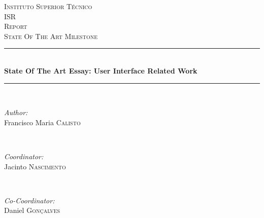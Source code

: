 \begin{titlepage}

\newcommand{\HRule}{\rule{\linewidth}{0.5mm}} %

\center %
 

\textsc{\LARGE Instituto Superior T\'{e}cnico}\\[1.5cm]
\textsc{\Large ISR}\\[0.5cm]
\textsc{\large Report}\\[0.25cm]
\textsc{\small State Of The Art Milestone}\\[0.25cm]


\HRule \\[0.5cm]
{ \large \bfseries State Of The Art Essay: User Interface Related Work}\\[0.25cm] %
\HRule \\[0.5cm]
 

\begin{minipage}{0.4\textwidth}
\begin{flushleft} \large
\emph{Author:}\\
Francisco Maria \textsc{Calisto} %
\end{flushleft}
\end{minipage}
~
\begin{minipage}{0.4\textwidth}
\begin{flushright} \large
\emph{Coordinator:} \\
Jacinto \textsc{Nascimento} %
\end{flushright}
~
\begin{flushright} \large
\emph{Co-Coordinator:} \\
Daniel \textsc{Gon\c{c}alves} %
\end{flushright}
\end{minipage}\\[2cm]


\end{titlepage}
